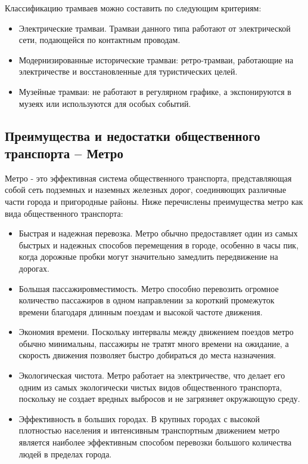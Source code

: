 Классификацию трамваев можно составить по следующим критериям:
\begin{itemize}
	\item Электрические трамваи. Трамваи данного типа работают от электрической сети, подающейся по контактным проводам.
	\item Модернизированные исторические трамваи: ретро-трамваи, работающие на электричестве и восстановленные для туристических целей.
	\item Музейные трамваи: не работают в регулярном графике, а экспонируются в музеях или используются для особых событий.
\end{itemize}

\subsection{Преимущества и недостатки общественного транспорта -- Метро}

Метро - это эффективная система общественного транспорта, представляющая собой сеть подземных и наземных железных дорог, соединяющих различные части города и пригородные районы. Ниже перечислены преимущества метро как вида общественного транспорта:
\begin{itemize}
	\item Быстрая и надежная перевозка. Метро обычно предоставляет один из самых быстрых и надежных способов перемещения в городе, особенно в часы пик, когда дорожные пробки могут значительно замедлить передвижение на дорогах.
	\item Большая пассажировместимость. Метро способно перевозить огромное количество пассажиров в одном направлении за короткий промежуток времени благодаря длинным поездам и высокой частоте движения.
	\item Экономия времени. Поскольку интервалы между движением поездов метро обычно минимальны, пассажиры не тратят много времени на ожидание, а скорость движения позволяет быстро добираться до места назначения.
	\item Экологическая чистота. Метро работает на электричестве, что делает его одним из самых экологически чистых видов общественного транспорта, поскольку не создает вредных выбросов и не загрязняет окружающую среду.
	\item Эффективность в больших городах. В крупных городах с высокой плотностью населения и интенсивным транспортным движением метро является наиболее эффективным способом перевозки большого количества людей в пределах города.
\end{itemize}


